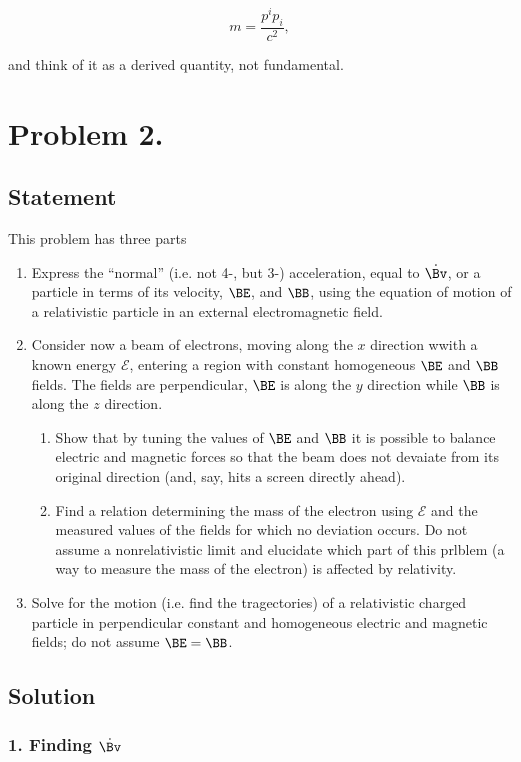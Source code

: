 \begin{equation}\label{eqn:relElectroDynProblemSet2:130b}
m = \frac{p^i p_i}{c^2},
\end{equation}

and think of it as a derived quantity, not fundamental.

\section{Problem 2.}
\subsection{Statement}

This problem has three parts
\begin{enumerate}
\item Express the ``normal'' (i.e. not 4-, but 3-) acceleration, equal to $\dot{\Bv}$, or a particle in terms of its velocity, $\BE$, and $\BB$, using the equation of motion of a relativistic particle in an external electromagnetic field.
\item Consider now a beam of electrons, moving along the $x$ direction wwith a known energy $\mathcal{E}$, entering a region with constant homogeneous $\BE$ and $\BB$ fields.  The fields are perpendicular, $\BE$ is along the $y$ direction while $\BB$ is along the $z$ direction.
\begin{enumerate}
\item
Show that by tuning the values of $\BE$ and $\BB$ it is possible to balance electric and magnetic forces so that the beam does not devaiate from its original direction (and, say, hits a screen directly ahead).
\item Find a relation determining the mass of the electron using $\mathcal{E}$ and the measured values of the fields for which no deviation occurs.  Do not assume a nonrelativistic limit and elucidate which part of this prlblem (a way to measure the mass of the electron) is affected by relativity.
\end{enumerate}
\item Solve for the motion (i.e. find the tragectories) of a relativistic charged particle in perpendicular constant and homogeneous electric and magnetic fields; do not assume $\BE = \BB$.
\end{enumerate}
\subsection{Solution}
\subsubsection{1. Finding $\dot{\Bv}$}


